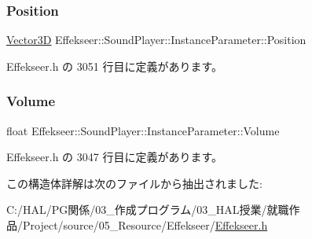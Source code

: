 \subsubsection{\texorpdfstring{Position}{Position}}
{\footnotesize\ttfamily \mbox{\hyperlink{struct_effekseer_1_1_vector3_d}{Vector3D}} Effekseer\+::\+Sound\+Player\+::\+Instance\+Parameter\+::\+Position}



 Effekseer.\+h の 3051 行目に定義があります。

\mbox{\label{struct_effekseer_1_1_sound_player_1_1_instance_parameter_ab128c51dd7ae26cc09c6a3ee716b9a14}} 
\subsubsection{\texorpdfstring{Volume}{Volume}}
{\footnotesize\ttfamily float Effekseer\+::\+Sound\+Player\+::\+Instance\+Parameter\+::\+Volume}



 Effekseer.\+h の 3047 行目に定義があります。



この構造体詳解は次のファイルから抽出されました\+:\begin{DoxyCompactItemize}
\item 
C\+:/\+H\+A\+L/\+P\+G関係/03\+\_\+作成プログラム/03\+\_\+\+H\+A\+L授業/就職作品/\+Project/source/05\+\_\+\+Resource/\+Effekseer/\mbox{\hyperlink{_effekseer_8h}{Effekseer.\+h}}\end{DoxyCompactItemize}
